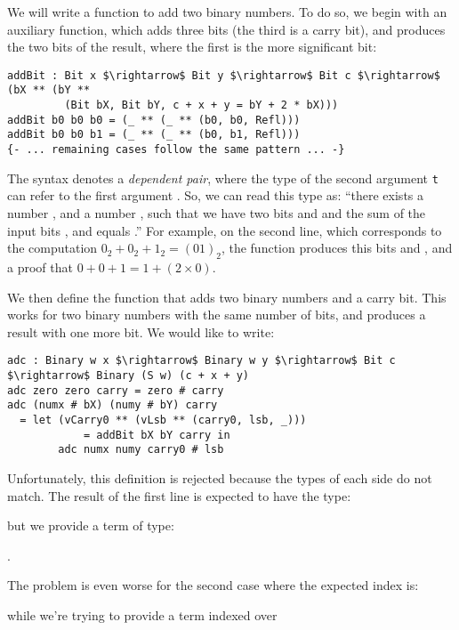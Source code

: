 We will write a function to add two binary numbers.
To do so, we begin with an auxiliary function, which adds three bits
(the third is a carry bit), and produces the two bits of
the result, where the first is the more significant bit:

\begin{lstlisting}
addBit : Bit x $\rightarrow$ Bit y $\rightarrow$ Bit c $\rightarrow$ (bX ** (bY ** 
         (Bit bX, Bit bY, c + x + y = bY + 2 * bX)))
addBit b0 b0 b0 = (_ ** (_ ** (b0, b0, Refl)))
addBit b0 b0 b1 = (_ ** (_ ** (b0, b1, Refl)))
{- ... remaining cases follow the same pattern ... -}
\end{lstlisting}

The syntax  denotes a \emph{dependent pair}, where the 
type of the second argument \texttt{t} can refer to the first argument
. So, we can read this type as: ``there exists a number ,
and a number , such that we have two bits  and
 and the sum of the input bits ,  and
 equals .''
For example, on the second line,
which corresponds to the computation $0_2 + 0_2 + 1_2 = (01)_2$,
the function produces this bits  and , and
a proof that $0 + 0 + 1 = 1 + (2 \times 0)$.

We then define the function  that adds two binary numbers and a carry
bit. This works for two binary numbers with the same number
of bits, and produces a result with one more bit. We would like to write:

\begin{lstlisting}
adc : Binary w x $\rightarrow$ Binary w y $\rightarrow$ Bit c $\rightarrow$ Binary (S w) (c + x + y)
adc zero zero carry = zero # carry
adc (numx # bX) (numy # bY) carry
  = let (vCarry0 ** (vLsb ** (carry0, lsb, _))) 
            = addBit bX bY carry in
        adc numx numy carry0 # lsb
\end{lstlisting}

Unfortunately, this definition is rejected because the types of each side do
not match.  The result of the first line  is expected
to have the type:

 but we provide a
term of type:

.

The problem is even worse for the second case where the expected index is:

while we're trying to provide a term indexed over

